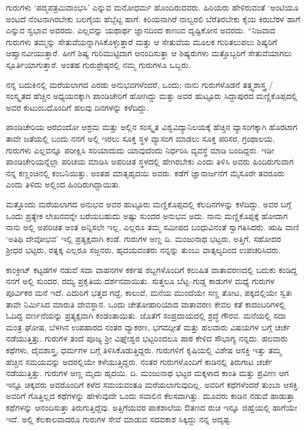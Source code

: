 ಗುರುಗಳು ‘ಪದ್ಮಪತ್ರಮಿವಾಂಭಸಿ’ ಎನ್ನುವ ಮನೋಧರ್ಮ ಹೊಂದಿರುವವರು. ಹಿರಿಯರು ಹೇಳಿರುವಂತೆ ‘ಅಂಟಿಯೂ ಅಂಟದೆ ನೆಂಟನಾಗಿರಬೇಕು ಬಲಗೈಯ ಹೆಬ್ಬೆಟ್ಟ ಹಾಗೆ. ಕಿರಿಯನಾಗಿರೆ ನಾಲ್ವರಲಿ ಬೆರೆತಿರಬೇಕು ಕೈಯ ಕಿರುಬೆರಳ ಹಾಗೆ ಎನ್ನುವ ಸ್ವಭಾವ ಅವರದು. ಎಲ್ಲವನ್ನು ಯಥಾರ್ಥ ಜ್ಞಾನದಿಂದ ಕಾಣುವ ದೃಷ್ಟಿಕೋನ ಅವರದು. “ನಿಜವಾದ ಗುರುಗಳು ತಮ್ಮನ್ನು ಸೇತುವೆಯನ್ನಾಗಿಸಿಕೊಳ್ಳುತ್ತಾರೆ ಮತ್ತು ಆ ಸೇತುವೆಯ ಮೂಲಕ ಗುರಿತಲುಪಲು ಶಿಷ್ಯರಿಗೆ ಆಹ್ವಾನವೀಯುತ್ತಾರೆ. ಹೀಗೆ ಶಿಷ್ಯ ಗುರಿಮುಟ್ಟಿದಾಗ ಆನಂದಿಸುತ್ತಾ ಆ ಶಿಷ್ಯರುಗಳು ಮತ್ತೊಬ್ಬರಿಗೆ ಸೇತುವೆಯಾಗಲು ಸ್ಪೂರ್ತಿಯಾಗುತ್ತಾರೆ. ಅಂತಹ ಗುರುಶ್ರೇಷ್ಠರಲ್ಲಿ ನಮ್ಮ ಗುರುಗಳೂ ಒಬ್ಬರು.

ನನ್ನ ಬದುಕಿನಲ್ಲಿ ಮರೆಯಲಾಗದ ಎರಡು ಅನುಭವಗಳೆಂದರೆ, ಒಂದು; ನಾನು ಗುರುಗಳೊಡನೆ ತತ್ತ್ವಶಾಸ್ತ್ರ / ಸಂಸ್ಕೃತದ ಹೆಚ್ಚಿನ ಅಧ್ಯಯನಕ್ಕಾಗಿ ಪಾಂಡಿಚೇರಿಗೆ ಹೋಗಿದ್ದು ಮತ್ತು ಅವರ ಹುಟ್ಟೂರು ಸಿದ್ದಾಪುರದ ಮಣ್ಣಿಕೊಪ್ಪದಲ್ಲಿ ಅವರ ಕುಟುಂಬದೊಂದಿಗೆ ಹಲವು ದಿನಗಳನ್ನು ಕಳೆದಿದ್ದು.

ಪಾಂಡಿಚೇರಿಯ ಅರಬಿಂದೋ ಆಶ್ರಮ ಮತ್ತು ಅಲ್ಲಿನ ಸಂಸ್ಕೃತ ವಿಶ್ವವಿದ್ಯಾನಿಲಯಕ್ಕೆ ಹೆಚ್ಚಿನ ವ್ಯಾಸಂಗಕ್ಕಾಗಿ ಹೊರಟಾಗ ತಾವೇ ಜತೆಯಲ್ಲಿ ಬಂದು ನನಗೆ ಅಲ್ಲಿ ಇರಲು ಸೂಕ್ತ ಸ್ಥಳ ವ್ಯಾಸಂಗ ಮಾಡಲು ಸೂಕ್ತ ಪರಿಸರ, ಗ್ರಂಥಾಲಯ, ಗುರುಗಳು ಎಲ್ಲವನ್ನೂ ಪರೀಕ್ಷಿಸಿ ಸರಿಯಾದುದು ಯಾವುದೆಂದು ನಿರ್ಧರಿಸಿ ವ್ಯವಸ್ಥೆ ಮಾಡಿ ಬಂದಿದ್ದರು. ಇಡೀ ಪಾಂಡಿಚೇರಿಯನ್ನೆಲ್ಲಾ ಪರಿಚಯ ಮಾಡಿಸಿ ಅಪರಿಚಿತ ಸ್ಥಳದಲ್ಲಿ ಹೇಗಿರಬೇಕು ಎಂದು ತಿಳಿಸಿ ಅವರು ಹಿಂದಿರುಗುವಾಗ ನನ್ನ ಕಣ್ಣಂಚಿನಲ್ಲಿ ಕಂಬನಿಯಿತ್ತು. ಅಂತಹ ಮಾತೃಹೃದಯಿ ಅವರು. ಕಡೆಗೆ ಜ್ಞಾನಾರ್ಜನೆಗೆ ಮೈಸೂರೇ ತವರೂರು ಎಂದು ತಿಳಿದು ಅಲ್ಲಿಂದ ಹಿಂದಿರುಗಿದ್ದಾಯಿತು.

ಮತ್ತೊಂದು ಮರೆಯಲಾಗದ ಅನುಭವ ಅವರ ಹುಟ್ಟೂರು ಮಣ್ಣಿಕೊಪ್ಪದಲ್ಲಿ ಕೆಲದಿನಗಳನ್ನು ಕಳೆದಿದ್ದು. ಅವರ ಬಗ್ಗೆ ಒಂದು ಪ್ರತ್ಯೇಕ ಲೇಖನವನ್ನೇ ಬರೆಯಬಹುದು ಅಷ್ಟು ಸುಂದರ ಅನುಭವ ಅದು. ನಾನು ಮಣ್ಣಿಕೊಪ್ಪಕ್ಕೆ ಹೋದಾಗ ನಾನು ಅಲ್ಲಿ ಅಪರಿಚಿತ ಅಂತ ಅನ್ನಿಸಲೇ ಇಲ್ಲ. ಎಲ್ಲರೂ ತಮ್ಮ ಸಮೀಪದ ಬಂಧುವಿನಂತೆ ಸ್ವಾಗತಿಸಿದರು. ಋಷಿ ವಾಣಿ ‘ಅತಿಥಿ ದೇವೋಭವ’ ಇಲ್ಲಿ ಪ್ರತ್ಯಕ್ಷವಾಗಿ ಕಂಡೆ. ಗುರುಗಳ ಅಣ್ಣ ದಿ. ಮಂಜುನಾಥ ಭಟ್ಟರು, ಅತ್ತಿಗೆ, ಸಹೋದರ ಶ್ರೀಧರ ಭಟ್ಟರು, ರತ್ನಕ್ಕ ಎಲ್ಲರೂ ಸಜ್ಜನರು, ಹೃದಯವಂತರು ನನ್ನನ್ನು ತುಂಬು ವಾತ್ಸಲ್ಯದಿಂದ ಉಪಚರಿಸಿದರು.

ಕಾಂಕ್ರೀಟ್ ಕಟ್ಟಡಗಳ ನಡುವೆ ಸದಾ ವಾಹನಗಳ ಕರ್ಕಷ ಶಬ್ದಗಳೊಂದಿಗೆ ಕಲುಷಿತ ವಾತಾವರಣದಲ್ಲಿ ಬದುಕು ಕಂಡಿದ್ದ ನನಗೆ ಅಲ್ಲಿ ಸುಂದರ, ರಮ್ಯ ಪ್ರಕೃತಿಯ ದರ್ಶನವಾಯಿತು. ಸುತ್ತಲೂ ಬೆಟ್ಟ–ಗುಡ್ಡ ಕಾಡುಗಳ ಮಧ್ಯೆ ಗುರುಗಳ ಪೂರ್ವಿಕರ ಮನೆ ಇದೆ. ಎದುರಿಗೆ ಭತ್ತದ ಗದ್ದೆ, ಕಾಲುವೆ, ಮನೆಯ ಮುಂದೆಯೇ ಸಣ್ಣ ತೋಟ, ಪಕ್ಕದಲ್ಲಿಯೇ ಸ್ವತಃ ತಾವೇ ನಿರ್ಮಿಸಿದ ಮಾರುತಿ ದೇವಸ್ಥಾನ. ಒಂದು ಚೇತೋಹಾರಿಯಾದ ವಾತಾವರಣ ಕೇವಲ ಕತೆ ಕಾದಂಬರಿಗಳಲ್ಲಿ ಓದಿದ್ದ ವರ್ಣನೆಯನ್ನು ಪ್ರತ್ಯಕ್ಷವಾಗಿ ಕಂಡಂತಾಯಿತು. ಜೊತೆಗೆ ಸಂಪ್ರದಾಯದಲ್ಲಿ ಶ್ರದ್ಧೆ ಗೌರವ. ಮನೆಯಲ್ಲಿ ಸದಾ ಮಂತ್ರ ಘೋಷ, ಬೆಳಗಿನ ಉಪಹಾರದ ನಂತರ ವ್ಯಾಕರಣ, ಭಗವದ್ಗೀತೆ ಮತ್ತು ಹಲವಾರು ವಿಷಯಗಳ ಬಗ್ಗೆ ಚರ್ಚೆ ನಡೆಯುತ್ತಿತ್ತು. ಗುರುಗಳ ತಂದೆ ಪೂಜ್ಯ ಶ್ರೀ ವಿಘ್ನೇಶ್ವರ ಭಟ್ಟರಿಂದಲೂ ಪಾಠ ಕೇಳಿದ ಸೌಭಾಗ್ಯ ನನ್ನದು. ಹಲವಾರು ಕಥೆಗಳು, ದೈವಶಾಸ್ತ್ರ, ಧರ್ಮಗಳ ಬಗ್ಗೆ ತಿಳಿಸಿಕೊಡುತ್ತಿದ್ದರು. ಗುರುಗಳಿಗೆ ಕೃಷಿಯಲ್ಲಿ ವಿಶೇಷ ಆಸಕ್ತಿ ಇತ್ತು ತಮ್ಮ ಹೆಚ್ಚಿನ ಸಮಯವನ್ನು ಅದರಲ್ಲಿಯೇ ಕಳೆಯುತ್ತಿದ್ದರು. ನಂತರ ಗುರುಗಳೊಂದಿಗೆ ಕಾಡಿನಲ್ಲಿ ತಿರುಗಾಟ ಚರ್ಚೆ ನಡೆಯುತ್ತಿತ್ತು. ಗುರುಗಳ ಅಣ್ಣ ಮೃದು ಹೃದಯಿ. ದಿ. ಮಂಜುನಾಥ ಭಟ್ಟರ ಮಕ್ಕಳಾದ ಕಾಂತಿ ಮತ್ತು ಪ್ರವೀಣ ಆಗ ಇನ್ನೂ ಚಿಕ್ಕವರು ಅವರೊಂದಿಗೆ ಕಳೆದ ಸಮಯವಂತೂ ಮರೆಯಲಾಗುವುದಿಲ್ಲ. ಅವರಿಗೆ ಕಥೆಗಳೆಂದರೆ ತುಂಬಾ ಆಸಕ್ತಿ. ಅವರಿಗೆ ಗೊತ್ತಿಲ್ಲದ ಕಥೆಗಳನ್ನು ಹೇಳುವುದೇ ಒಂದು ಸವಾಲಿನ ಕೆಲಸವಾಗಿತ್ತು. ಮೂವರು ಕಾಡಿನ ನಡುವೆ ಹಾಡುತ್ತಾ ಕಥೆಗಳನ್ನು ಆನಂದಿಸುತ್ತಾ ತಿರುಗುತ್ತಿದ್ದೆವು. ಅತ್ತಿಗೆಯವರ ಪಾಕಶಾಲೆಯ ಔತಣದ ರುಚಿ ಇನ್ನೂ ಜಿಹ್ವೆಯಲ್ಲಿ ಹಾಗೆಯೇ ಇದೆ. ಅಲ್ಲಿ ಕೆಲಕಾಲವಾದರೂ ಗುರುಗಳ ಸೇವೆ ಮಾಡುವ ಸದವಕಾಶ ಸಿಕ್ಕಿದ್ದು ನನ್ನ ಅದೃಷ್ಟ.

